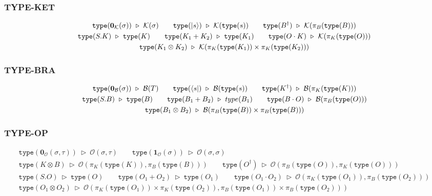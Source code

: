 \documentclass[manuscript, review, timestamp]{acmart}
\newcommand*{\K}{\mathcal{K}}
\newcommand*{\type}{\texttt{type}}
\newcommand*{\reduce}{\ \triangleright\ }
\begin{document}
\subsubsection*{\textsf{TYPE-KET}}
\begin{gather*}
  \type(\mathbf{0}_\mathcal{K}(\sigma)) \reduce \K(\sigma)
  \qquad
  \type(\ket{s}) \reduce \K(\type(s))
  \qquad
  \type(B^\dagger) \reduce \K(\pi_B(\type(B))) 
  \\
  \type(S . K) \reduce \type(K)
  \qquad
  \type(K_1 + K_2) \reduce \type(K_1)
  \qquad
  \type(O \cdot K) \reduce \K(\pi_K(\type(O)))
  \\
  \type(K_1 \otimes K_2) \reduce \K(\pi_K(\type(K_1)) \times \pi_K(\type(K_2)))
\end{gather*}

\subsubsection*{\textsf{TYPE-BRA}}
\begin{gather*}
  \type(\mathbf{0}_\mathcal{B}(\sigma)) \reduce \mathcal{B}(T)
  \qquad
  \type(\bra{s}) \reduce \mathcal{B}(\type(s))
  \qquad
  \type(K^\dagger) \reduce \mathcal{B}(\pi_K(\type(K)))
  \\
  \type(S . B) \reduce \type(B)
  \qquad
  \type(B_1 + B_2) \reduce type(B_1)
  \qquad
  \type(B \cdot O) \reduce \mathcal{B}(\pi_B(\type(O)))
  \\
  \type(B_1 \otimes B_2) \reduce \mathcal{B}(\pi_B(\type(B)) \times \pi_B(\type(B)))
\end{gather*}

\subsubsection*{\textsf{TYPE-OP}}
\begin{gather*}
  \type(\mathbf{0}_\mathcal{O}(\sigma, \tau)) \reduce \mathcal{O}(\sigma, \tau)
  \qquad
  \type(\mathbf{1}_\mathcal{O}(\sigma)) \reduce \mathcal{O}(\sigma, \sigma)
  \\
  \type(K \otimes B) \reduce \mathcal{O}(\pi_K(\type(K)), \pi_B(\type(B)))
  \qquad
  \type(O^\dagger) \reduce \mathcal{O}(\pi_B(\type(O)), \pi_K(\type(O)))
  \\
  \type(S . O) \reduce \type(O)
  \qquad
  \type(O_1 + O_2) \reduce \type(O_1)
  \qquad
  \type(O_1 \cdot O_2) \reduce \mathcal{O}(\pi_K(\type(O_1)), \pi_B(\type(O_2)))
  \\
  \type(O_1 \otimes O_2) \reduce \mathcal{O}(\pi_K(\type(O_1)) \times \pi_K(\type(O_2)), \pi_B(\type(O_1)) \times \pi_B(\type(O_2)))
\end{gather*}
\end{document}
